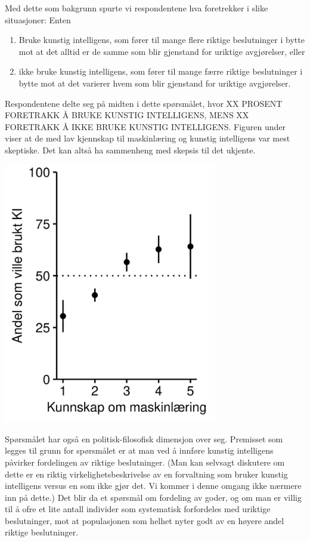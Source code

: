 \documentclass[
]{book}
\begin{document}
Med dette som bakgrunn spurte vi respondentene hva foretrekker i slike situasjoner:
Enten

\begin{enumerate}
\def\labelenumi{\arabic{enumi}.}
\item
  Bruke kunstig intelligens, som fører til mange flere riktige beslutninger i bytte mot at det alltid er de samme som blir gjenstand for uriktige avgjørelser, eller
\item
  ikke bruke kunstig intelligens, som fører til mange færre riktige beslutninger i bytte mot at det varierer hvem som blir gjenstand for uriktige avgjørelser.
\end{enumerate}

Respondentene delte seg på midten i dette spørsmålet, hvor XX PROSENT FORETRAKK Å BRUKE KUNSTIG INTELLIGENS, MENS XX FORETRAKK Å IKKE BRUKE KUNSTIG INTELLIGENS.
Figuren under viser at de med lav kjennskap til maskinlæring og kunstig intelligens var mest skeptiske.
Det kan altså ha sammenheng med skepsis til det ukjente.

\includegraphics[width=0.7\textwidth,height=\textheight]{figs/png/fig_relval_ml_know.png}

Spørsmålet har også en politisk-filosofisk dimensjon over seg.
Premisset som legges til grunn for spørsmålet er at man ved å innføre kunstig intelligens påvirker fordelingen av riktige beslutninger.
(Man kan selvsagt diskutere om dette er en riktig virkelighetsbeskrivelse av en forvaltning som bruker kunstig intelligens versus en som ikke gjør det.
Vi kommer i denne omgang ikke nærmere inn på dette.)
Det blir da et spørsmål om fordeling av goder, og om man er villig til å ofre et lite antall individer som systematisk forfordeles med uriktige beslutninger, mot at populasjonen som helhet nyter godt av en høyere andel riktige beslutninger.
\end{document}
